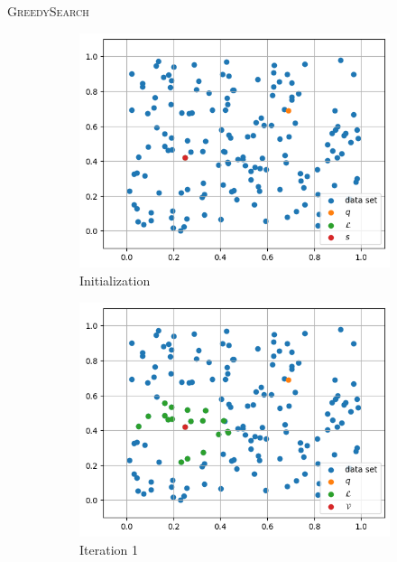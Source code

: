 \begin{frame}{\textsc{GreedySearch}}
    \begin{figure}[h]
        \centering
        \hfill
        \begin{subfigure}{0.31\textwidth}
            \includegraphics[width=\textwidth]{images/greedy-search-begin}
            \caption{Initialization}
        \end{subfigure}
        \hfill
        \begin{subfigure}{0.31\textwidth}
            \includegraphics[width=\textwidth]{images/greedy-search-1}
            \caption{Iteration 1}
        \end{subfigure}
        \hfill
        \begin{subfigure}{0.31\textwidth}

\end{subfigure}
\end{figure}
\end{frame}

